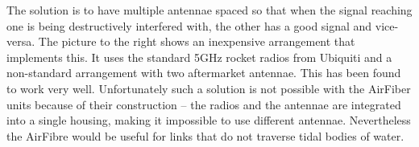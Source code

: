 The solution is to have multiple antennae spaced so that when
the signal reaching one is being destructively interfered with, the
other has a good signal and vice-versa. The picture to the right shows
an inexpensive arrangement that implements this. It uses the standard
5GHz rocket radios from Ubiquiti and a non-standard arrangement with
two aftermarket antennae. This has been found to work very
well. Unfortunately such a solution is not possible with the AirFiber
units because of their construction -- the radios and the antennae are
integrated into a single housing, making it impossible to use
different antennae. Nevertheless the AirFibre would be useful for
links that do not traverse tidal bodies of water.
